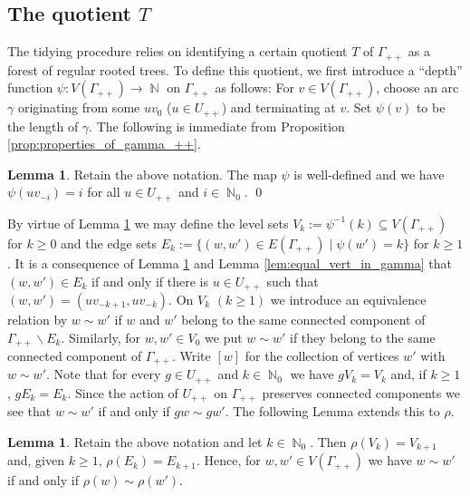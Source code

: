 \documentclass{article}
\DeclareMathOperator\bbN{\mathbb{N}}
\theoremstyle{definition}
\newtheorem{lemma}[theorem]{Lemma}
\begin{document}
\subsection{The quotient $T$}
The tidying procedure relies on identifying a certain quotient $T$ of $\Gamma_{++}$ as a forest of regular rooted trees. To define this quotient, we first introduce a ``depth'' function $\psi:V(\Gamma_{++})\to \bbN$ on $\Gamma_{++}$ as follows: For $v\in V(\Gamma_{++})$, choose an arc $\gamma$ originating from some $uv_0$ ($u\in U_{++}$) and terminating at $v$. Set $\psi(v)$ to be the length of $\gamma$. The following is immediate from Proposition \ref{prop:properties_of_gamma_++}.

\begin{lemma}\label{lem:level_sets}
Retain the above notation. The map $\psi$ is well-defined and we have $\psi(uv_{-i}) = i$ for all $u\in U_{++}$ and $i\in\bbN_{0}$. \qed
\end{lemma}

By virtue of Lemma \ref{lem:level_sets} we may define the level sets $V_{k}:=\psi^{-1}(k)\subseteq V(\Gamma_{++})$ for $k\ge 0$ and
the edge sets $E_{k}:=\{(w,w')\in E(\Gamma_{++})\mid\psi(w')=k\}$ for $k\ge 1$. It is a consequence of Lemma \ref{lem:level_sets} and Lemma \ref{lem:equal_vert_in_gamma} that  $(w,w')\in E_{k}$ if and only if there is $u\in U_{++}$ such that $(w,w')=(uv_{-k + 1}, uv_{-k})$. On $V_{k}$ $(k\ge 1)$ we introduce an equivalence relation by $w\sim w'$ if $w$ and $w'$ belong to the same connected component of $\Gamma_{++}\backslash E_{k}$. Similarly, for $w,w'\in V_{0}$ we put $w\sim w'$ if they belong to the same connected component of $\Gamma_{++}$. Write $[w]$ for the collection of vertices $w'$ with $w\sim w'$. Note that for every $g\in U_{++}$ and $k\in\bbN_{0}$ we have $gV_{k} = V_{k}$ and, if $k\ge 1$, $gE_{k} = E_{k}$. Since the action of $U_{++}$ on $\Gamma_{++}$ preserves connected components we see that $w\sim w'$ if and only if $gw\sim gw'$. The following Lemma extends this to $\rho$.

\begin{lemma}\label{lem:equiv_classes_preserved_by_action}
Retain the above notation and let $k\in\bbN_{0}$. Then $\rho(V_{k})\!=\! V_{k+1}$ and, given $k\ge 1$, $\rho(E_{k}) = E_{k+1}$. Hence, for $w,w'\!\in\! V(\Gamma_{++})$ we have $w\!\sim\! w'$ if and only if $\rho(w)\!\sim\! \rho(w')$.
\end{lemma}
 
\end{document}
